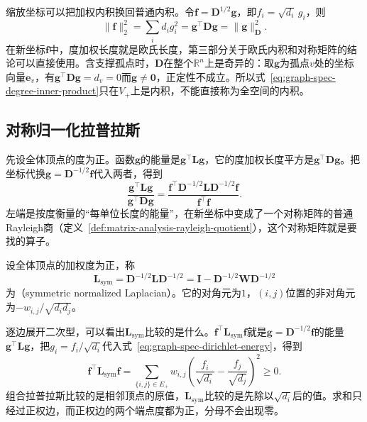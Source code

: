 缩放坐标可以把加权内积换回普通内积。令$\bm f=\bm D^{1/2}\bm g$，即$f_i=\sqrt{d_i}\,g_i$，则
\[
 \lVert\bm f\rVert_2^2=\sum_id_ig_i^2=\bm g^{\top}\bm D\bm g=\lVert\bm g\rVert_{\bm D}^2 .
\]
在新坐标$\bm f$中，度加权长度就是欧氏长度，第三部分关于欧氏内积和对称矩阵的结论可以直接使用。含支撑孤点时，$\bm D$在整个$\mathbb R^n$上是奇异的：取$\bm g$为孤点$v$处的坐标向量$\bm e_v$，有$\bm g^{\top}\bm D\bm g=d_v=0$而$\bm g\neq\bm0$，正定性不成立。所以式~\eqref{eq:graph-spec-degree-inner-product}只在$V_+$上是内积，不能直接称为全空间的内积。

\subsection{对称归一化拉普拉斯}
\label{sec:graph-spec-symmetric-normalized}

先设全体顶点的度为正。函数$\bm g$的能量是$\bm g^{\top}\bm L\bm g$，它的度加权长度平方是$\bm g^{\top}\bm D\bm g$。把坐标代换$\bm g=\bm D^{-1/2}\bm f$代入两者，得到
\[
 \frac{\bm g^{\top}\bm L\bm g}{\bm g^{\top}\bm D\bm g}
 =\frac{\bm f^{\top}\bm D^{-1/2}\bm L\bm D^{-1/2}\bm f}{\bm f^{\top}\bm f}.
\]
左端是按度衡量的“每单位长度的能量”，在新坐标中变成了一个对称矩阵的普通Rayleigh商（定义~\ref{def:matrix-analysis-rayleigh-quotient}），这个对称矩阵就是要找的算子。

\begin{definition}[对称归一化拉普拉斯]
\label{def:graph-spec-symmetric-normalized-laplacian}
设全体顶点的加权度为正，称
\begin{equation}
 \bm L_{\mathrm{sym}}=\bm D^{-1/2}\bm L\bm D^{-1/2}=\bm I-\bm D^{-1/2}\bm W\bm D^{-1/2}
 \label{eq:graph-spec-symmetric-normalized-laplacian}
\end{equation}
为（symmetric normalized Laplacian）。它的对角元为$1$，$(i,j)$位置的非对角元为$-w_{i,j}/\sqrt{d_id_j}$。
\end{definition}

逐边展开二次型，可以看出$\bm L_{\mathrm{sym}}$比较的是什么。$\bm f^{\top}\bm L_{\mathrm{sym}}\bm f$就是$\bm g=\bm D^{-1/2}\bm f$的能量$\bm g^{\top}\bm L\bm g$，把$g_i=f_i/\sqrt{d_i}$代入式~\eqref{eq:graph-spec-dirichlet-energy}，得到
\begin{equation}
 \bm f^{\top}\bm L_{\mathrm{sym}}\bm f=\sum_{\{i,j\}\in E_+}w_{i,j}\left(\frac{f_i}{\sqrt{d_i}}-\frac{f_j}{\sqrt{d_j}}\right)^2\geq0 .
 \label{eq:graph-spec-normalized-energy}
\end{equation}
组合拉普拉斯比较的是相邻顶点的原值，$\bm L_{\mathrm{sym}}$比较的是先除以$\sqrt{d_i}$后的值。求和只经过正权边，而正权边的两个端点度都为正，分母不会出现零。

